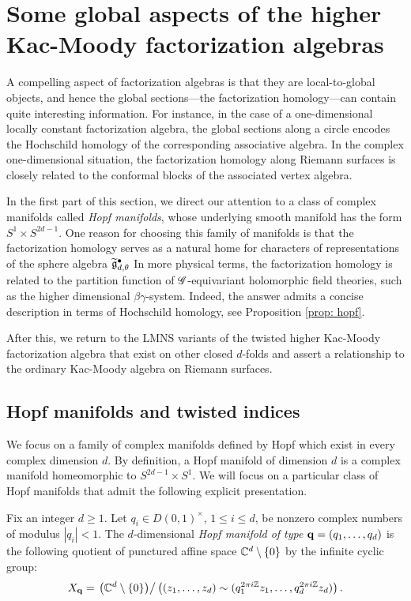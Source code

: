 \section{Some global aspects of the higher Kac-Moody factorization algebras}

A compelling aspect of factorization algebras is that they are local-to-global objects,
and hence the global sections---the factorization homology---can contain quite interesting information.
For instance, in the case of a one-dimensional locally constant factorization algebra, the global sections along a circle encodes the Hochschild homology of the corresponding associative algebra. 
In the complex one-dimensional situation, the factorization homology along Riemann surfaces is closely related to the conformal blocks of the associated vertex algebra. 

In the first part of this section, we direct our attention to a class of complex manifolds called {\em Hopf manifolds},
whose underlying smooth manifold has the form $S^1 \times S^{2d-1}$.
One reason for choosing this family of manifolds is that the factorization homology serves as a natural home for characters of representations of the sphere algebra $\widetilde{\mathfrak g}_{d,\theta}^\bullet$
In more physical terms, the factorization homology is related to the partition function of $\mathscr G$-equivariant holomorphic field theories, such as the higher dimensional $\beta\gamma$-system.
Indeed, the answer admits a concise description in terms of Hochschild homology, see Proposition \ref{prop: hopf}. 

After this, we return to the LMNS variants of the twisted higher Kac-Moody factorization algebra that exist on other closed $d$-folds and assert a relationship to the ordinary Kac-Moody algebra on Riemann surfaces. 

\subsection{Hopf manifolds and twisted indices}

We focus on a family of complex manifolds defined by Hopf \cite{Hopf} which exist in every complex dimension $d$. 
By definition, a Hopf manifold of dimension $d$ is a complex manifold homeomorphic to $S^{2d-1} \times S^1$. 
We will focus on a particular class of Hopf manifolds that admit the following explicit presentation. 

\begin{dfn}
Fix an integer $d \geq 1$. 
Let $q_i \in D(0,1)^{\times}$, $1 \leq i \leq d$, be nonzero complex numbers of modulus $|q_i| <1$. 
The $d$-dimensional {\em Hopf manifold of type} ${\bf q} = (q_1,\ldots,q_d)$ is the following quotient of punctured affine space $\mathbb C^d \setminus \{0\}$ by the infinite cyclic group:
\[
X_{\bf q} = \left. \left(\mathbb C^d \setminus \{0\}\right) \right/ \left( (z_1,\ldots,z_d) \sim (q_1^{2\pi i \mathbb Z} z_1, \ldots,q_d^{2 \pi i \mathbb Z} z_d) \right) .
\]
\end{dfn}

